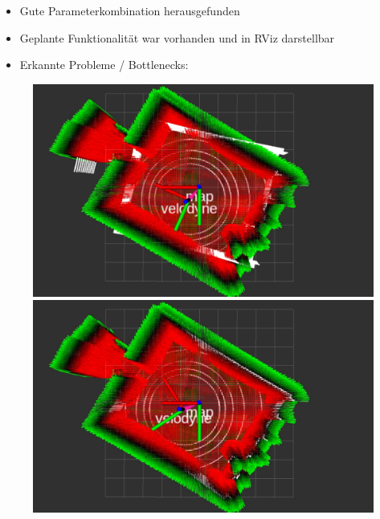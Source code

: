 \documentclass{beamer}
\begin{document}
\begin{frame}{\subsecname}
\begin{itemize}
\item Gute Parameterkombination herausgefunden
\item Geplante Funktionalität war vorhanden und in RViz darstellbar
\item Erkannte Probleme / Bottlenecks:
\end{itemize}
\begin{figure}
    \includegraphics[width=\linewidth]{images/demo1.jpg}
\endminipage\hfill
{}
    \includegraphics[width=\linewidth]{images/demo2.jpg}
\endminipage\hfill
\end{figure}
\end{frame}
\end{document}
